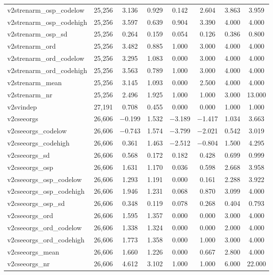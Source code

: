 \begin{table}[!htbp]
\begin{tabular}{@{\extracolsep{5pt}}lccccccc}
v2strenarm\_osp\_codelow & 25,256 & 3.136 & 0.929 & 0.142 & 2.604 & 3.863 & 3.959 \\ 
v2strenarm\_osp\_codehigh & 25,256 & 3.597 & 0.639 & 0.904 & 3.390 & 4.000 & 4.000 \\ 
v2strenarm\_osp\_sd & 25,256 & 0.264 & 0.159 & 0.054 & 0.126 & 0.386 & 0.800 \\ 
v2strenarm\_ord & 25,256 & 3.482 & 0.885 & 1.000 & 3.000 & 4.000 & 4.000 \\ 
v2strenarm\_ord\_codelow & 25,256 & 3.295 & 1.083 & 0.000 & 3.000 & 4.000 & 4.000 \\ 
v2strenarm\_ord\_codehigh & 25,256 & 3.563 & 0.789 & 1.000 & 3.000 & 4.000 & 4.000 \\ 
v2strenarm\_mean & 25,256 & 3.145 & 1.093 & 0.000 & 2.500 & 4.000 & 4.000 \\ 
v2strenarm\_nr & 25,256 & 2.496 & 1.925 & 1.000 & 1.000 & 3.000 & 13.000 \\ 
v2svindep & 27,191 & 0.708 & 0.455 & 0.000 & 0.000 & 1.000 & 1.000 \\ 
v2cseeorgs & 26,606 & $-$0.199 & 1.532 & $-$3.189 & $-$1.417 & 1.034 & 3.663 \\ 
v2cseeorgs\_codelow & 26,606 & $-$0.743 & 1.574 & $-$3.799 & $-$2.021 & 0.542 & 3.019 \\ 
v2cseeorgs\_codehigh & 26,606 & 0.361 & 1.463 & $-$2.512 & $-$0.804 & 1.500 & 4.295 \\ 
v2cseeorgs\_sd & 26,606 & 0.568 & 0.172 & 0.182 & 0.428 & 0.699 & 0.999 \\ 
v2cseeorgs\_osp & 26,606 & 1.631 & 1.170 & 0.036 & 0.598 & 2.668 & 3.958 \\ 
v2cseeorgs\_osp\_codelow & 26,606 & 1.293 & 1.191 & 0.000 & 0.161 & 2.288 & 3.922 \\ 
v2cseeorgs\_osp\_codehigh & 26,606 & 1.946 & 1.231 & 0.068 & 0.870 & 3.099 & 4.000 \\ 
v2cseeorgs\_osp\_sd & 26,606 & 0.348 & 0.119 & 0.078 & 0.268 & 0.404 & 0.793 \\ 
v2cseeorgs\_ord & 26,606 & 1.595 & 1.357 & 0.000 & 0.000 & 3.000 & 4.000 \\ 
v2cseeorgs\_ord\_codelow & 26,606 & 1.338 & 1.324 & 0.000 & 0.000 & 2.000 & 4.000 \\ 
v2cseeorgs\_ord\_codehigh & 26,606 & 1.773 & 1.358 & 0.000 & 1.000 & 3.000 & 4.000 \\ 
v2cseeorgs\_mean & 26,606 & 1.660 & 1.226 & 0.000 & 0.667 & 2.800 & 4.000 \\ 
v2cseeorgs\_nr & 26,606 & 4.612 & 3.102 & 1.000 & 1.000 & 6.000 & 22.000 \\ 

\end{tabular}
\end{table}

